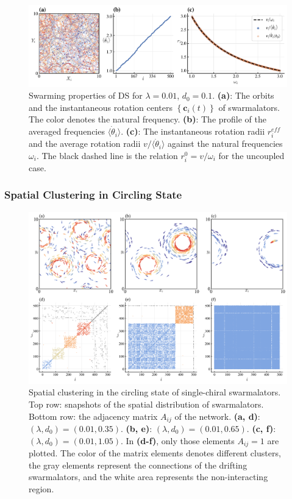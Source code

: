 \documentclass{article}
\begin{document}
\begin{figure}[H]
    \includegraphics[width=\textwidth]{./figs/mono-DS.pdf}
    \caption{
        \label{fig:mono-DS} Swarming properties of DS for $\lambda =0.01$, $d_0 =0.1$. 
        \textbf{(a)}: The orbits and the instantaneous rotation centers $\left\{ \mathbf{c}_i (t)\right\}$ of swarmalators. The color denotes the natural frequency.
        \textbf{(b)}: The profile of the averaged frequencies $\langle \dot{\theta}_i \rangle$.
        \textbf{(c)}: The instantaneous rotation radii $ r_i^{eff}$ and the average rotation radii $v/\langle \dot{\theta}_i \rangle$ against the natural frequencies $\omega_i$. The black dashed line is the relation $r_i^0 = v/\omega_i$ for the uncoupled case.
    }
\end{figure}

\subsubsection{Spatial Clustering in Circling State}

\begin{figure}[H]
    \includegraphics[width=\textwidth]{./figs/mono_CS_Aij.png}
    \caption{
        \label{fig:mono_CS_Aij}
        Spatial clustering in the circling state of single-chiral swarmalators. 
        Top row: snapshots of the spatial distribution of swarmalators. Bottom row: the adjacency matrix $A_{ij}$ of the network. 
        \textbf{(a, d)}: $(\lambda, d_0)=(0.01, 0.35)$.
        \textbf{(b, e)}: $(\lambda, d_0)=(0.01, 0.65)$.
        \textbf{(c, f)}: $(\lambda, d_0)=(0.01, 1.05)$.
        In \textbf{(d-f)}, only those elements $A_{ij}=1$ are plotted. The color of the matrix elements denotes different clusters, the gray elements represent the connections of the drifting swarmalators, and the white area represents the non-interacting region.
    }
\end{figure}
\end{document}
